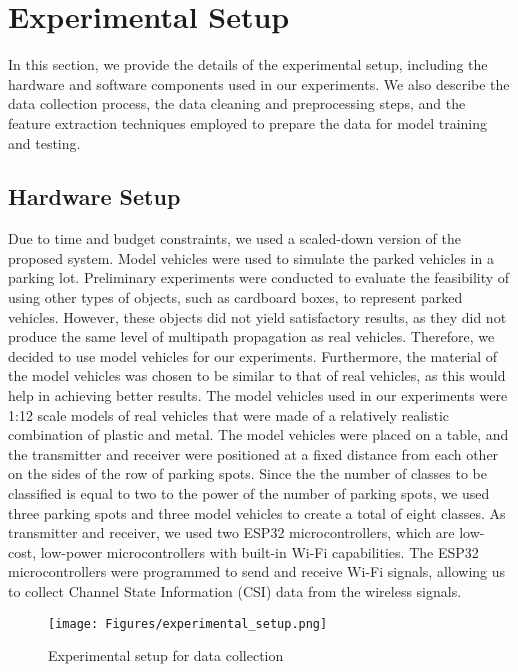 \vspace{-1mm}
\section{Experimental Setup}
\label{sec:experimental_setup}

In this section, we provide the details of the experimental setup, including the hardware and software components used in our experiments. We also describe the data collection process, the data cleaning and preprocessing steps, and the feature extraction techniques employed to prepare the data for model training and testing.

\subsection{Hardware Setup}

Due to time and budget constraints, we used a scaled-down version of the proposed system. Model vehicles were used to simulate the parked vehicles in a parking lot. Preliminary experiments were conducted to evaluate the feasibility of using other types of objects, such as cardboard boxes, to represent parked vehicles. However, these objects did not yield satisfactory results, as they did not produce the same level of multipath propagation as real vehicles. Therefore, we decided to use model vehicles for our experiments. Furthermore, the material of the model vehicles was chosen to be similar to that of real vehicles, as this would help in achieving better results. The model vehicles used in our experiments were 1:12 scale models of real vehicles that were made of a relatively realistic combination of plastic and metal. The model vehicles were placed on a table, and the transmitter and receiver were positioned at a fixed distance from each other on the sides of the row of parking spots. Since the the number of classes to be classified is equal to two to the power of the number of parking spots, we used three parking spots and three model vehicles to create a total of eight classes. As transmitter and receiver, we used two ESP32 microcontrollers, which are low-cost, low-power microcontrollers with built-in Wi-Fi capabilities. The ESP32 microcontrollers were programmed to send and receive Wi-Fi signals, allowing us to collect Channel State Information (CSI) data from the wireless signals. 

\begin{figure}[H]
    \begin{center}
        \texttt{[image: Figures/experimental\_setup.png]}\vspace{0mm}
        \caption{Experimental setup for data collection}\vspace{0mm}
        \label{fig:experimental_setup}
    \end{center}
\end{figure}

